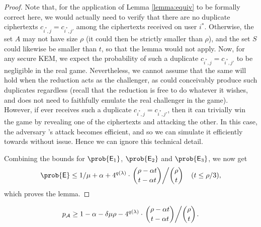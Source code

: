 \begin{proof}
  Note that, for the application of Lemma \ref{lemma:equiv} to be formally correct here,
  we would actually need to verify that there are no duplicate ciphertexts
  \(c_{i^{*},j} = c_{i^{*},j'}\) among the ciphertexts received on user \(i^{*}\).
  Otherwise, the set \(A\) may not have size \(\rho\)
  (it could then be strictly smaller than \(\rho\)),
  and the set \(S\) could likewise be smaller than \(t\),
  so that the lemma would not apply.
  Now, for any secure KEM, we expect the probability of such a
  duplicate \(c_{i^{*},j} = c_{i^{*},j'}\) to be negligible in the real \OWECPA game.
  Nevertheless, we cannot assume that the same will hold
  when the reduction \redR acts as the challenger,
  as \redR could conceivably produce such duplicates regardless
  (recall that the reduction is free to do whatever it wishes, and does not need to
  faithfully emulate the real challenger in the \OWECPA game).
  However, if \advA ever receives such a duplicate \(c_{i^{*},j} = c_{i^{*},j'}\),
  then it can trivially win the \OWECPA game by revealing one of the ciphertexts and attacking the other.
  In this case, the adversary \advA's attack becomes efficient,
  and so we can simulate it efficiently towards \redR without issue.
  Hence we can ignore this technical detail.

  Combining the bounds for \(\prob{\eventi{1}}\), \(\prob{\eventi{2}}\) and \(\prob{\eventi{3}}\), we now get
  \begin{align}\label{ineq:E}
    \prob{\eventE} \le 1 / \mu + \alpha +
    4^{q(\lambda)} \cdot \left. \binom{\rho - \alpha t}{t - \alpha t} \middle/ \binom{\rho}{t} \right. && (t \le \rho / 3),
  \end{align}
  which proves the lemma.
\end{proof}

\begin{lemma}\label{lemma:A}
  \begin{equation}
    p_{\advA} \ge 1 - \alpha - \delta \mu \rho
    - 4^{q(\lambda)} \cdot \left. \binom{\rho - \alpha t}{t - \alpha t} \middle/ \binom{\rho}{t} \right..
  \end{equation}
\end{lemma}

